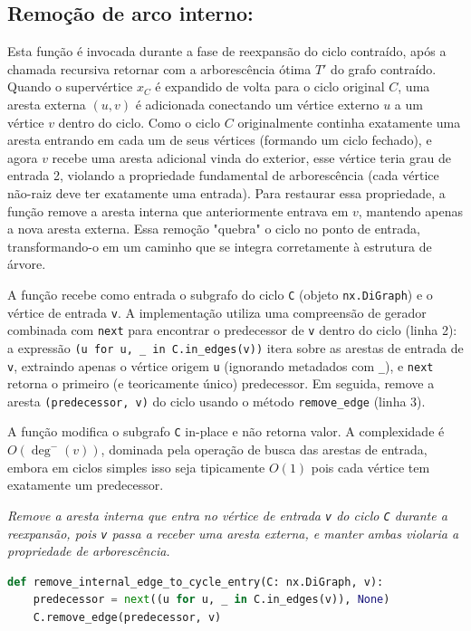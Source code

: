 \subsection{Remoção de arco interno:}

Esta função é invocada durante a fase de reexpansão do ciclo contraído, após a chamada recursiva retornar com a arborescência ótima \(T'\) do grafo contraído. Quando o supervértice \(x_C\) é expandido de volta para o ciclo original \(C\), uma aresta externa \((u,v)\) é adicionada conectando um vértice externo \(u\) a um vértice \(v\) dentro do ciclo. Como o ciclo \(C\) originalmente continha exatamente uma aresta entrando em cada um de seus vértices (formando um ciclo fechado), e agora \(v\) recebe uma aresta adicional vinda do exterior, esse vértice teria grau de entrada 2, violando a propriedade fundamental de arborescência (cada vértice não-raiz deve ter exatamente uma entrada). Para restaurar essa propriedade, a função remove a aresta interna que anteriormente entrava em \(v\), mantendo apenas a nova aresta externa. Essa remoção "quebra" o ciclo no ponto de entrada, transformando-o em um caminho que se integra corretamente à estrutura de árvore.

A função recebe como entrada o subgrafo do ciclo \texttt{C} (objeto \texttt{nx.DiGraph}) e o vértice de entrada \texttt{v}. A implementação utiliza uma compreensão de gerador combinada com \texttt{next} para encontrar o predecessor de \texttt{v} dentro do ciclo (linha 2): a expressão \texttt{(u for u, \_ in C.in\_edges(v))} itera sobre as arestas de entrada de \texttt{v}, extraindo apenas o vértice origem \texttt{u} (ignorando metadados com \texttt{\_}), e \texttt{next} retorna o primeiro (e teoricamente único) predecessor. Em seguida, remove a aresta \texttt{(predecessor, v)} do ciclo usando o método \texttt{remove\_edge} (linha 3).

A função modifica o subgrafo \texttt{C} in-place e não retorna valor. A complexidade é \(O(\deg^-(v))\), dominada pela operação de busca das arestas de entrada, embora em ciclos simples isso seja tipicamente \(O(1)\) pois cada vértice tem exatamente um predecessor.

\begin{tcolorbox}[
        enhanced, breakable,
        colframe=blue!60!black, colback=blue!2,
        colbacktitle=blue!15, coltitle=black,
        title={Remover arco interno na reexpansão},
        boxed title style={sharp corners, boxrule=0.6pt},
        sharp corners, boxrule=0.6pt
    ]
    \emph{Remove a aresta interna que entra no vértice de entrada \texttt{v} do ciclo \texttt{C} durante a reexpansão, pois \texttt{v} passa a receber uma aresta externa, e manter ambas violaria a propriedade de arborescência.}
    \tcblower
    \begin{lstlisting}[mathescape=true, language=Python]
def remove_internal_edge_to_cycle_entry(C: nx.DiGraph, v):
    predecessor = next((u for u, _ in C.in_edges(v)), None)
    C.remove_edge(predecessor, v) 
\end{lstlisting}
\end{tcolorbox}

